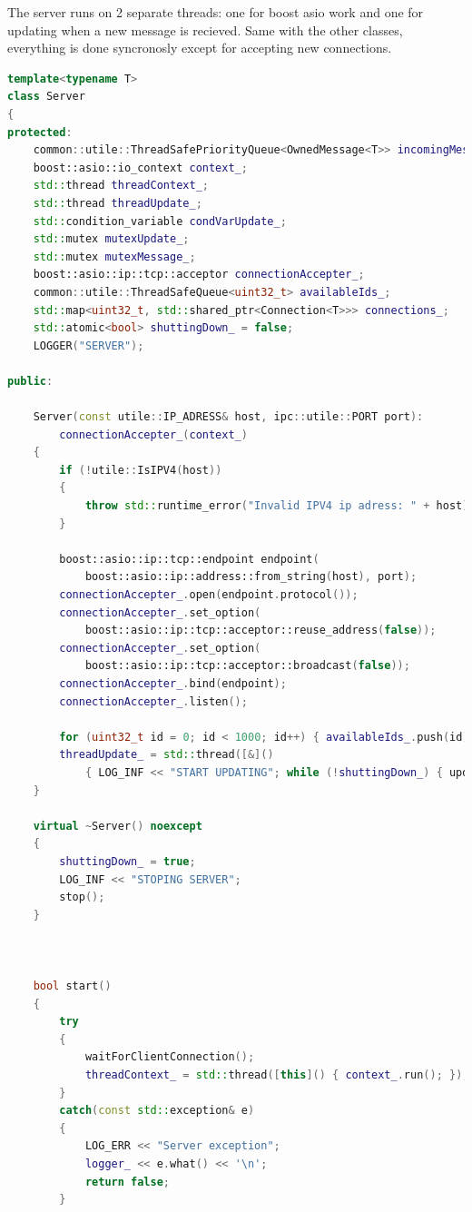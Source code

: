 \documentclass[17pt]{article}
\begin{document}
\pagebreak

\indent \indent
The server runs on 2 separate threads: one for boost asio work and one for updating 
when a new message is recieved. Same with the other classes, everything is done 
syncronosly except for accepting new connections.

\begin{lstlisting}[language = C++]
template<typename T>
class Server
{
protected:
    common::utile::ThreadSafePriorityQueue<OwnedMessage<T>> incomingMessagesQueue_;
    boost::asio::io_context context_;
    std::thread threadContext_;
    std::thread threadUpdate_;
    std::condition_variable condVarUpdate_;
    std::mutex mutexUpdate_;
    std::mutex mutexMessage_;
    boost::asio::ip::tcp::acceptor connectionAccepter_;
    common::utile::ThreadSafeQueue<uint32_t> availableIds_;
    std::map<uint32_t, std::shared_ptr<Connection<T>>> connections_;
    std::atomic<bool> shuttingDown_ = false;
    LOGGER("SERVER");

public:

    Server(const utile::IP_ADRESS& host, ipc::utile::PORT port):
        connectionAccepter_(context_)
    {
        if (!utile::IsIPV4(host))
        {
            throw std::runtime_error("Invalid IPV4 ip adress: " + host);
        }

        boost::asio::ip::tcp::endpoint endpoint(
            boost::asio::ip::address::from_string(host), port);
        connectionAccepter_.open(endpoint.protocol());
        connectionAccepter_.set_option(
            boost::asio::ip::tcp::acceptor::reuse_address(false));
        connectionAccepter_.set_option(
            boost::asio::ip::tcp::acceptor::broadcast(false));
        connectionAccepter_.bind(endpoint);
        connectionAccepter_.listen();

        for (uint32_t id = 0; id < 1000; id++) { availableIds_.push(id); }   
        threadUpdate_ = std::thread([&]() 
            { LOG_INF << "START UPDATING"; while (!shuttingDown_) { update(); }});
    }

    virtual ~Server() noexcept
    {
        shuttingDown_ = true;
        LOG_INF << "STOPING SERVER";
        stop();
    }



    bool start()
    {
        try
        {
            waitForClientConnection();
            threadContext_ = std::thread([this]() { context_.run(); });
        }
        catch(const std::exception& e)
        {
            LOG_ERR << "Server exception";
            logger_ << e.what() << '\n';
            return false;
        }


\end{lstlisting}
\end{document}
